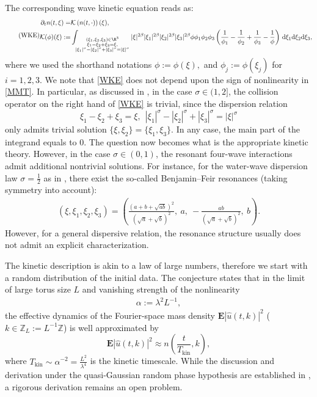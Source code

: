 \documentclass[UTF-8,reqno]{amsart}
\numberwithin{equation}{section}
\theoremstyle{definition}
\def\dif{{\mathord{{\rm d}}}}
\def\dif{{\mathord{{\rm d}}}}
\begin{document}
     The corresponding  wave kinetic equation reads as:
\begin{align*}
\tag{WKE}\label{WKE}
\begin{split}
\partial_t n(t, \xi) =&\mathcal K\left(n(t,\cdot)\right)(\xi), \\
\mathcal K(\phi)(\xi):=& \int_{\substack{(\xi_1, \xi_2, \xi_3)\in \R^{3}\\\xi_1-\xi_2+\xi_3=\xi,\\ |\xi_1|^\sigma-|\xi_2|^\sigma+|\xi_3|^\sigma=|\xi|^\sigma}}|\xi|^{2\beta}|\xi_1|^{2\beta}|\xi_2|^{2\beta}|\xi_3|^{2\beta} \phi \phi_1 \phi_2 \phi_3\left(\frac{1}{\phi_1}-\frac{1}{\phi_2}+\frac{1}{\phi_3}-\frac{1}{\phi}\right)\, \dif \xi_1 \dif \xi_2 \dif \xi_3,
\end{split}
\end{align*}
where we used the shorthand notations $\phi:=\phi(\xi),$ and $\phi_j:=\phi(\xi_j)$ for $i=1,2,3$. We note that \eqref{WKE} does not depend upon the sign of nonlinearity in \eqref{MMT}. In particular, as discussed in \cite{MMT97}, in the case $\sigma\in(1,2]$, the collision operator on the right hand of \eqref{WKE} is trivial, since the   dispersion relation $$\xi_1-\xi_2+\xi_3=\xi,\ \ |\xi_1|^\sigma-|\xi_2|^\sigma+|\xi_3|^\sigma=|\xi|^\sigma$$ only admits trivial solution  $\{\xi,\xi_2\}=\{\xi_1,\xi_3\}$.  In any case, the  main part of the integrand equals to 0.  The question now becomes what
 is the appropriate kinetic theory. However, in the case $\sigma \in (0,1)$, the resonant four-wave interactions admit additional nontrivial solutions. For instance, for the water-wave dispersion law $\sigma = \tfrac{1}{2}$ as in \cite{DIP25a,DIP25}, there exist the so-called Benjamin–Feir resonances (taking symmetry into account):
\begin{align*}
( \xi,\xi_1,\xi_2,\xi_3)=  \left( \frac{(a+b+\sqrt{ab})^2}{(\sqrt{a}+\sqrt{b})^2},\ a,\  -\frac{ab}{(\sqrt{a}+\sqrt{b})^2},\ b\right).
\end{align*}
However, for a general dispersive relation, the resonance structure usually does not admit an explicit characterization.


The kinetic  description  is  akin to a law of large numbers,  therefore
we start with a random distribution of the initial data. The conjecture   states that  in the limit of large torus size $L$ and vanishing strength of the nonlinearity 
\begin{align}
  \alpha:=\lambda^2L^{-1},\label{def:alpha}  
\end{align}
the effective dynamics of the Fourier-space mass density $\mathbf E |\widehat u(t, k)|^2$ ($k \in \mathbb{Z}_L:=L^{-1}\mathbb{Z}$) is well approximated  by
\begin{equation}\label{approximation}
\mathbf E |\widehat u(t, k)|^2 \approx n\left(\frac{t}{T_{\mathrm{kin}}}, k\right),
\end{equation}
 where $T_{\mathrm{kin}}\sim \alpha^{-2}=\frac{L^{2}}{\lambda^4}$ is the  kinetic timescale. While the discussion and derivation under the quasi-Gaussian random phase hypothesis are established in \cite{MMT97}, a rigorous derivation remains an open problem.
\end{document}
